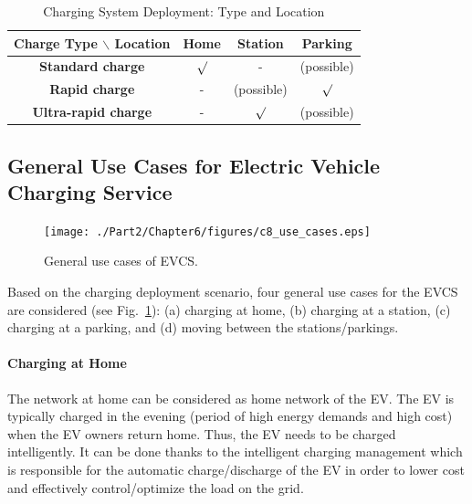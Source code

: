 \begin{table}[ht]
\footnotesize
\captionsetup{font=footnotesize}
\caption[Electrical vehicle charging system deployment: type and location.]{Charging System Deployment: Type and Location}
\label{tap:type_location}
\centering
\begin{tabular}{|c |c |c |c |}%
\hline
\textbf{Charge Type $\backslash$ Location} & \textbf{Home} & \textbf{Station} & \textbf{Parking}   \\
\hline
\textbf{Standard charge} &  $\surd$ & - & (possible)\\
\hline
\textbf{Rapid charge}  & - &  (possible)  & $\surd$ \\
\hline
\textbf{Ultra-rapid charge} & - & $\surd$&  (possible)  \\
\hline
\end{tabular}
\end{table}

\subsection{General Use Cases for Electric Vehicle Charging Service}
\begin{figure}[h!] 
 \begin{center} 
 \texttt{[image: ./Part2/Chapter6/figures/c8\_use\_cases.eps]}
    \caption[General use cases of the electrical vehicle charging service]{General use cases of EVCS.}
     \label{fig:c8_use-cases}
  \end{center} 
\end{figure}

Based on the charging deployment scenario, four general use cases for the EVCS are considered (see Fig.~\ref{fig:c8_use-cases}): (a) charging at home, (b) charging at a station, (c) charging at a parking, and (d) moving between the stations/parkings. 
\paragraph{Charging at Home} The network at home can be considered as home network of the EV. The EV is typically charged in the evening (period of high energy demands and high cost) when the EV owners return home. Thus, the EV needs to be charged intelligently. It can be done thanks to the intelligent charging management which is responsible for the automatic charge/discharge of the EV in order to lower cost and effectively control/optimize the load on the grid.
